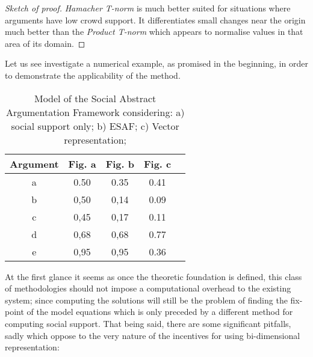 \documentclass{article}
\begin{document}
\begin{proof} [Sketch of proof]
\emph{Hamacher T-norm} is much better suited for situations where arguments have low crowd support. It differentiates small changes near the origin much better than the \emph{Product T-norm} which appears to normalise values in that area of its domain.
\end{proof}
Let us see investigate a numerical example, as promised in the beginning, in order to demonstrate the applicability of the method.





\renewcommand{\tabcolsep}{0.3cm}
\begin{table}[ht]
  \caption{Model of the Social Abstract Argumentation Framework considering: a) social support only; b) ESAF; c) Vector representation;\\}
  \centering %
\begin{tabular}{c c c c c} %
\hline\hline %
Argument &  Fig. a & Fig. b & Fig. c & \\ [0.7ex] %
\hline %
a & 0.50 & 0.35 & 0.41\\ %
b & 0,50 & 0,14 & 0.09\\
c & 0,45 &  0,17 & 0.11 \\
d & 0,68 & 0,68 & 0.77 \\ 
e & 0,95 & 0,95 & 0.36 \\ [1ex] %
\hline %
\end{tabular}
\label{table:figs} %
\end{table}





At the first glance it seems as once the theoretic foundation is defined, this class of methodologies should not impose a computational overhead to the existing system; since computing the solutions will still be the problem of finding the fix-point of the model equations which is only preceded by a different method for computing social support. 
That being said, there are some significant pitfalls, sadly which oppose to the very nature of the incentives for using bi-dimensional representation:
\end{document}
